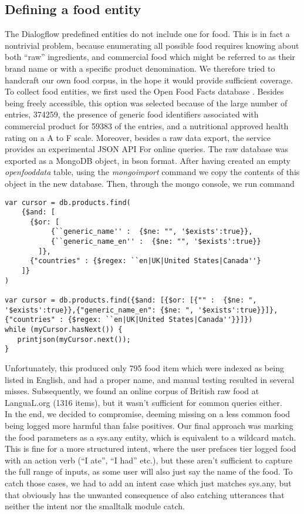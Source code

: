 \subsection{Defining a food entity}
The Dialogflow predefined entities do not include one for food. This is in fact a nontrivial problem, because enumerating all possible food requires knowing about both ``raw'' ingredients, and commercial food which might be referred to as their brand name or with a specific product denomination. We therefore tried to handcraft our own food corpus, in the hope it would provide sufficient coverage.
To collect food entities, we first used the Open Food Facts database \cite{openfoodfacts}. Besides being freely accessible, this option was selected because of the large number of entries, 374259, the presence of generic food identifiers associated with commercial product for 59383 of the entries, and a nutritional approved health rating on a A to F scale. Moreover, besides a raw data export, the service provides an experimental JSON API For online queries. 
The raw database was exported as a MongoDB \cite{mongo} object, in bson format. After having created an empty \textit{openfooddata} table, using the \textit{mongoimport} command we copy the contents of this object in the new database. Then, through the mongo console, we run command
\begin{lstlisting}
var cursor = db.products.find( 
    {$and: [
      {$or: [
           {``generic_name'' :  {$ne: "", '$exists':true}},
           {``generic_name_en'' :  {$ne: "", '$exists':true}}
        ]},
      {"countries" : {$regex: ``en|UK|United States|Canada''}
    ]}
)

var cursor = db.products.find({$and: [{$or: [{"" :  {$ne: ", '$exists':true}},{"generic_name_en": {$ne: ", '$exists':true}}]}, {"countries" : {$regex: ``en|UK|United States|Canada''}}]})
while (myCursor.hasNext()) {
   printjson(myCursor.next());
}
\end{lstlisting}
Unfortunately, this produced only 795 food item which were indexed as being listed in English, and had a proper name, and manual testing resulted in several misses. Subsequently, we found an online corpus of British raw food at LanguaL.org \cite{langual}(1316 items), but it wasn't sufficient for common queries either. \\
In the end, we decided to compromise, deeming missing on a less common food being logged more harmful than false positives. Our final approach was marking the food parameters as a sys.any entity, which is equivalent to a wildcard match. This is fine for a more structured intent, where the user prefaces tier logged food with an action verb (``I ate'', ``I had'' etc.), but these aren't sufficient to capture the full range of inputs, as some user will also just say the name of the food. To catch those cases, we had to add an intent case which just matches sys.any, but that obviously has the unwanted consequence of also catching utterances that neither the intent nor the smalltalk module catch.
